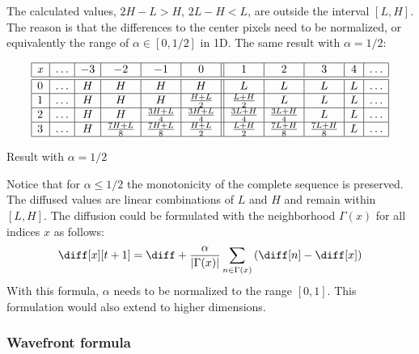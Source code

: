 The calculated values, $2H-L>H$, $2L-H<L$, are outside the interval $[L,H]$.
The reason is that the differences to the center pixels need to be normalized, or
equivalently the range of $\alpha \in [0,1/2]$ in 1D. The same result with $\alpha=1/2$:

\begin{table}[h]
    \centering
    $$
        \begin{array}{|l|c|c|c|c|c||c|c|c|c|c|} \hline
        x&\ldots&       -3       &       -2       &       -1        &       0         &       1         &       2         &       3        &       4        &\ldots\\\hline \hline
        0&\ldots&        H       &        H       &        H        &       H         &       L         &       L         &       L        &       L        &\ldots\\\hline
        1&\ldots&        H       &        H       &        H        & \frac{H+L}{2}   & \frac{L+H}{2}   &       L         &       L        &       L        &\ldots\\\hline
        2&\ldots&        H       &        H       &  \frac{3H+L}{4} & \frac{3H+L}{4}  & \frac{3L+H}{4}  & \frac{3L+H}{4}  &       L        &       L        &\ldots\\\hline
        3&\ldots&        H       & \frac{7H+L}{8} &  \frac{7H+L}{8} & \frac{H+L}{2}   & \frac{L+H}{2}   & \frac{7L+H}{8}  & \frac{7L+H}{8} &       L        &\ldots\\\hline
        \end{array}
    $$
    \caption{Result with $\alpha=1/2$}
    \label{tab:1D:result_a0d5}
\end{table}

Notice that for $\alpha \le 1/2$ the monotonicity of the complete sequence is preserved.
The diffused values are linear combinations of $L$ and $H$ and remain within $[L,H]$.
The diffusion could be formulated with the neighborhood $\Gamma(x)$ for all indices $x$ 
as follows:
%
\begin{equation}\label{eq:1D:normalized}
    \diff[x][t+1] = \diff + \frac{\alpha}{|\Gamma(x)|} \sum_{n \in \Gamma(x)} \left(\diff[n] - \diff[x]\right)
\end{equation}
%
With this formula, $\alpha$ needs to be normalized to the range $[0,1]$. This formulation 
would also extend to higher dimensions.

\subsubsection{Wavefront formula}

